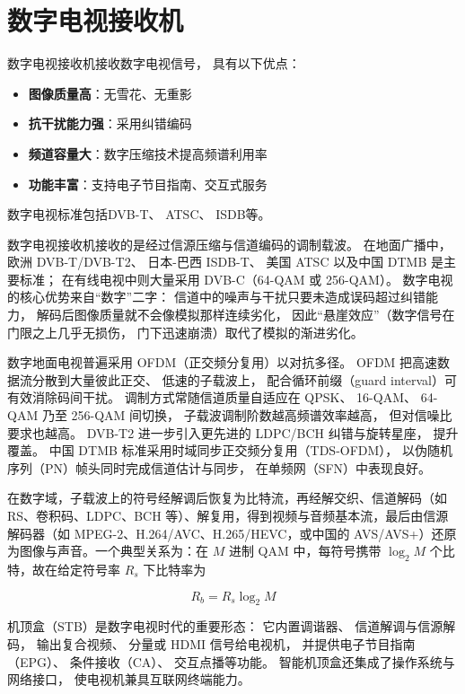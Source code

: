 \section{数字电视接收机}
\label{sec:digital_tv_receiver}

数字电视接收机接收数字电视信号，
具有以下优点：

\begin{itemize}
    \item \textbf{图像质量高}：无雪花、无重影
    \item \textbf{抗干扰能力强}：采用纠错编码
    \item \textbf{频道容量大}：数字压缩技术提高频谱利用率
    \item \textbf{功能丰富}：支持电子节目指南、交互式服务
\end{itemize}

数字电视标准包括DVB-T、
ATSC、
ISDB等。

数字电视接收机接收的是经过信源压缩与信道编码的调制载波。
在地面广播中，
欧洲 DVB-T/DVB-T2、
日本-巴西 ISDB-T、
美国 ATSC 以及中国 DTMB 是主要标准；
在有线电视中则大量采用 DVB-C（64-QAM 或 256-QAM）。
数字电视的核心优势来自“数字”二字：
信道中的噪声与干扰只要未造成误码超过纠错能力，
解码后图像质量就不会像模拟那样连续劣化，
因此“悬崖效应”（数字信号在门限之上几乎无损伤，
门下迅速崩溃）取代了模拟的渐进劣化。

数字地面电视普遍采用 OFDM（正交频分复用）以对抗多径。
OFDM 把高速数据流分散到大量彼此正交、
低速的子载波上，
配合循环前缀（guard interval）可有效消除码间干扰。
调制方式常随信道质量自适应在 QPSK、
16-QAM、
64-QAM 乃至 256-QAM 间切换，
子载波调制阶数越高频谱效率越高，
但对信噪比要求也越高。
DVB-T2 进一步引入更先进的 LDPC/BCH 纠错与旋转星座，
提升覆盖。
中国 DTMB 标准采用时域同步正交频分复用（TDS-OFDM），
以伪随机序列（PN）帧头同时完成信道估计与同步，
在单频网（SFN）中表现良好。

在数字域，子载波上的符号经解调后恢复为比特流，再经解交织、信道解码（如 RS、卷积码、LDPC、BCH 等）、解复用，得到视频与音频基本流，最后由信源解码器（如 MPEG-2、H.264/AVC、H.265/HEVC，或中国的 AVS/AVS+）还原为图像与声音。一个典型关系为：在 $M$ 进制 QAM 中，每符号携带 $\log_2 M$ 个比特，故在给定符号率 $R_s$ 下比特率为

\[
R_b=R_s\log_2 M
\]

机顶盒（STB）是数字电视时代的重要形态：
它内置调谐器、
信道解调与信源解码，
输出复合视频、
分量或 HDMI 信号给电视机，
并提供电子节目指南（EPG）、
条件接收（CA）、
交互点播等功能。
智能机顶盒还集成了操作系统与网络接口，
使电视机兼具互联网终端能力。

